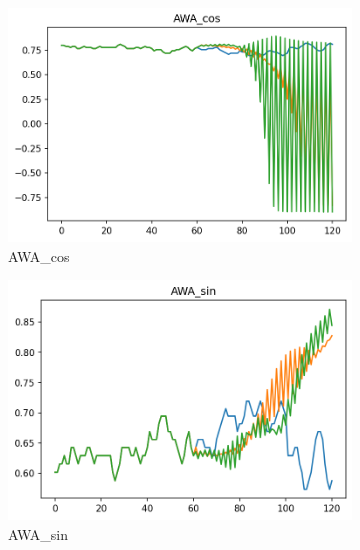 \begin{figure}[ht]
     \centering
     \begin{subfigure}[b]{0.32\textwidth}
         \centering
         \includegraphics[width=\textwidth]{figures/prediction-plots-joint/AWA_cos.png}
         \caption{AWA\_cos}
     \end{subfigure}
     \begin{subfigure}[b]{0.32\textwidth}
         \centering
         \includegraphics[width=\textwidth]{figures/prediction-plots-joint/AWA_sin.png}
         \caption{AWA\_sin}
     \end{subfigure}
     \begin{subfigure}[b]{0.32\textwidth}
         \centering

\end{subfigure}
\end{figure}
